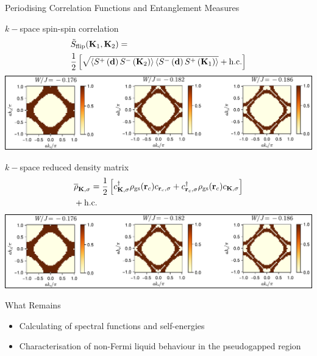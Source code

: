 \documentclass[12pt,aspectratio=169]{beamer}
\begin{document}
\begin{frame}{Periodising Correlation Functions and Entanglement Measures}
	\begin{minipage}{0.49\textwidth}
	\(k-\)space spin-spin correlation
	\begin{equation*}\begin{aligned}
	&\tilde{S}_\text{flip}({\bf K}_1, {\bf K}_2) = \\
	&\frac{1}{2}\left[\sqrt{\braket{S^+\left({\bf d}\right)S^-\left({\bf K}_2\right)}\braket{S^-\left({\bf d}\right)S^+\left({\bf K}_1\right)}} + \text{h.c.}\right]
	\end{aligned}\end{equation*}
	\includegraphics[width=\textwidth]{scattProb.pdf}
	\end{minipage}
	\begin{minipage}{0.49\textwidth}
	\(k-\)space reduced density matrix
	\begin{equation*}\begin{aligned}
		&\overline\rho_{{\bf K},\sigma} = \frac{1}{2}\left[c^\dagger_{{\bf K},\sigma} \rho_\text{gs}({\bf r}_c) c_{{\bf r}_c,\sigma} + c^\dagger_{{\bf r}_c,\sigma} \rho_\text{gs}({\bf r}_c) c_{{\bf K},\sigma}\right] \\
		& + \text{h.c.}
	\end{aligned}\end{equation*}
	\includegraphics[width=\textwidth]{scattProb.pdf}
	\end{minipage}
	
\end{frame}

\begin{frame}{What Remains}
	\begin{itemize}
		\item Calculating of spectral functions and self-energies
		\item Characterisation of non-Fermi liquid behaviour in the pseudogapped region
	\end{itemize}
\end{frame}
\end{document}
